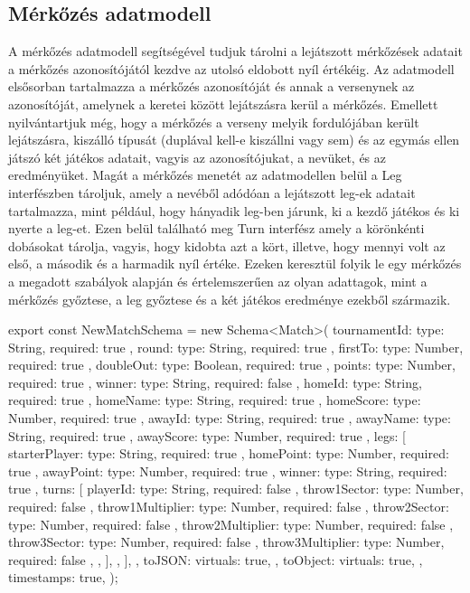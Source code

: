 \subsection{Mérkőzés adatmodell}
A mérkőzés adatmodell segítségével tudjuk tárolni a lejátszott mérkőzések adatait a mérkőzés azonosítójától kezdve az utolsó eldobott nyíl értékéig. Az adatmodell elsősorban tartalmazza a mérkőzés azonosítóját és annak a versenynek az azonosítóját, amelynek a keretei között lejátszásra kerül a mérkőzés. Emellett nyilvántartjuk még, hogy a mérkőzés a verseny melyik fordulójában került lejátszásra, kiszálló típusát (duplával kell-e kiszállni vagy sem) és az egymás ellen játszó két játékos adatait, vagyis az azonosítójukat, a nevüket, és az eredményüket. Magát a mérkőzés menetét az adatmodellen belül a Leg interfészben tároljuk, amely a nevéből adódóan a lejátszott leg-ek adatait tartalmazza, mint például, hogy hányadik leg-ben járunk, ki a kezdő játékos és ki nyerte a leg-et. Ezen belül található meg Turn interfész amely a körönkénti dobásokat tárolja, vagyis, hogy kidobta azt a kört, illetve, hogy mennyi volt az első, a második és a harmadik nyíl értéke. Ezeken keresztül folyik le egy mérkőzés a megadott szabályok alapján és értelemszerűen az olyan adattagok, mint a mérkőzés győztese, a leg győztese és a két játékos eredménye ezekből származik.

\begin{cpp}
export const NewMatchSchema = new Schema<Match>(
  {
    tournamentId: { type: String, required: true },
    round: { type: String, required: true },
    firstTo: { type: Number, required: true },
    doubleOut: { type: Boolean, required: true },
    points: { type: Number, required: true },
    winner: { type: String, required: false },
    homeId: { type: String, required: true },
    homeName: { type: String, required: true },
    homeScore: { type: Number, required: true },
    awayId: { type: String, required: true },
    awayName: { type: String, required: true },
    awayScore: { type: Number, required: true },
    legs: [
      {
        starterPlayer: { type: String, required: true },
        homePoint: { type: Number, required: true },
        awayPoint: { type: Number, required: true },
        winner: { type: String, required: true },
        turns: [
          {
            playerId: { type: String, required: false },
            throw1Sector: { type: Number, required: false },
            throw1Multiplier: { type: Number, required: false },
            throw2Sector: { type: Number, required: false },
            throw2Multiplier: { type: Number, required: false },
            throw3Sector: { type: Number, required: false },
            throw3Multiplier: { type: Number, required: false },
          },
        ],
      },
    ],
  },
  {
    toJSON: {
      virtuals: true,
    },
    toObject: {
      virtuals: true,
    },
    timestamps: true,
  }
);
\end{cpp}

